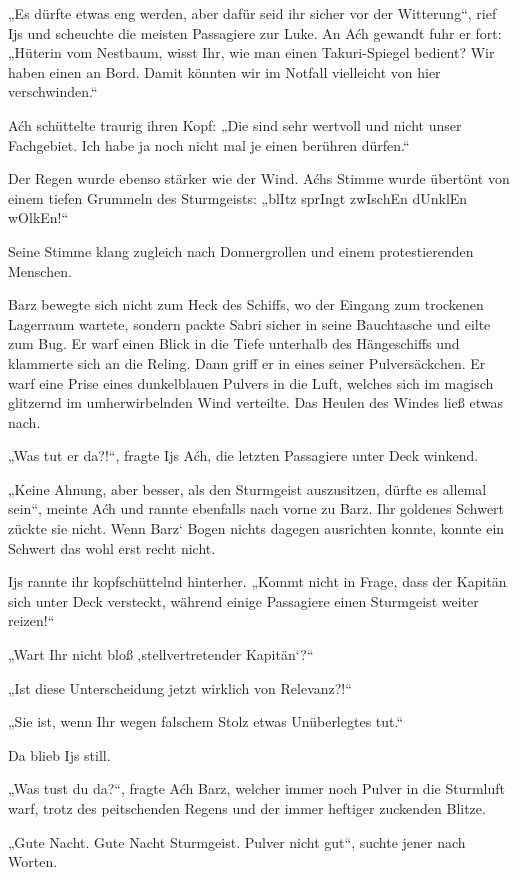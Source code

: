 „Es dürfte etwas eng werden, aber dafür seid ihr sicher vor der Witterung“, rief Ijs und scheuchte die meisten Passagiere zur Luke. An Aćh gewandt fuhr er fort: „Hüterin vom Nestbaum, wisst Ihr, wie man einen Takuri-Spiegel bedient? Wir haben einen an Bord. Damit könnten wir im Notfall vielleicht von hier verschwinden.“

Aćh schüttelte traurig ihren Kopf: „Die sind sehr wertvoll und nicht unser Fachgebiet. Ich habe ja noch nicht mal je einen berühren dürfen.“

Der Regen wurde ebenso stärker wie der Wind. Aćhs Stimme wurde übertönt von einem tiefen Grummeln des Sturmgeists: „blItz sprIngt zwIschEn dUnklEn wOlkEn!“

Seine Stimme klang zugleich nach Donnergrollen und einem protestierenden Menschen.

Barz bewegte sich nicht zum Heck des Schiffs, wo der Eingang zum trockenen Lagerraum wartete, sondern packte Sabri sicher in seine Bauchtasche und eilte zum Bug. Er warf einen Blick in die Tiefe unterhalb des Hängeschiffs und klammerte sich an die Reling. Dann griff er in eines seiner Pulversäckchen. Er warf eine Prise eines dunkelblauen Pulvers in die Luft, welches sich im magisch glitzernd im umherwirbelnden Wind verteilte. Das Heulen des Windes ließ etwas nach.

„Was tut er da?!“, fragte Ijs Aćh, die letzten Passagiere unter Deck winkend.

„Keine Ahnung, aber besser, als den Sturmgeist auszusitzen, dürfte es allemal sein“, meinte Aćh und rannte ebenfalls nach vorne zu Barz. Ihr goldenes Schwert zückte sie nicht. Wenn Barz‘ Bogen nichts dagegen ausrichten konnte, konnte ein Schwert das wohl erst recht nicht.

Ijs rannte ihr kopfschüttelnd hinterher. „Kommt nicht in Frage, dass der Kapitän sich unter Deck versteckt, während einige Passagiere einen Sturmgeist weiter reizen!“

„Wart Ihr nicht bloß ‚stellvertretender Kapitän‘?“

„Ist diese Unterscheidung jetzt wirklich von Relevanz?!“

„Sie ist, wenn Ihr wegen falschem Stolz etwas Unüberlegtes tut.“

Da blieb Ijs still.

„Was tust du da?“, fragte Aćh Barz, welcher immer noch Pulver in die Sturmluft warf, trotz des peitschenden Regens und der immer heftiger zuckenden Blitze.

„Gute Nacht. Gute Nacht Sturmgeist. Pulver nicht gut“, suchte jener nach Worten.

